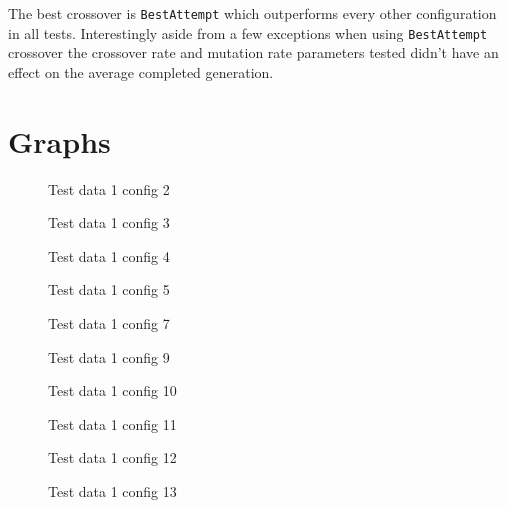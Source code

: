 \documentclass[conference]{IEEEtran}
\begin{document}
The best crossover is \texttt{BestAttempt} which outperforms every other configuration in all tests. Interestingly aside from a few exceptions when using \texttt{BestAttempt} crossover the crossover rate and mutation rate parameters tested didn't have an effect on the average completed generation.  




\appendices
\label{appendix:a}

\section{Graphs}

\begin{figure}[H]
    \centering
    
    \caption{Test data 1 config 2}
    \label{fig:td1_config2}
\end{figure}
\begin{figure}[H]
    \centering
    
    \caption{Test data 1 config 3}
    \label{fig:td1_config3}
\end{figure}
\begin{figure}[H]
    \centering
    
    \caption{Test data 1 config 4}
    \label{fig:td1_config4}
\end{figure}
\begin{figure}[H]
    \centering
    
    \caption{Test data 1 config 5}
    \label{fig:td1_config5}
\end{figure}
\begin{figure}[H]
    \centering
    
    \caption{Test data 1 config 7}
    \label{fig:td1_config7}
\end{figure}
\begin{figure}[H]
    \centering
    
    \caption{Test data 1 config 9}
    \label{fig:td1_config9}
\end{figure}
\begin{figure}[H]
    \centering
    
    \caption{Test data 1 config 10}
    \label{fig:td1_config10}
\end{figure}
\begin{figure}[H]
    \centering
    
    \caption{Test data 1 config 11}
    \label{fig:td1_config11}
\end{figure}
\begin{figure}[H]
    \centering
    
    \caption{Test data 1 config 12}
    \label{fig:td1_config12}
\end{figure}
\begin{figure}[H]
    \centering
    
    \caption{Test data 1 config 13}
    \label{fig:td1_config13}
\end{figure}
\end{document}
